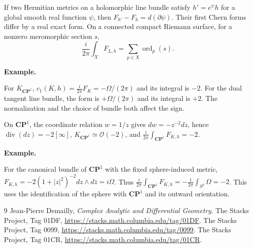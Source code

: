 \documentclass[11pt]{article}
\newcommand{\CP}{\mathbf{CP}}
\newcommand{\exampleheading}{\par\medskip\textbf{Example.}\par\smallskip}
\begin{document}
\begin{tcolorbox}[namedstatement,breakable,title={Metric independence and degree}]
If two Hermitian metrics on a holomorphic line bundle satisfy $h'=e^\psi h$ for a global smooth real function $\psi$, then $F_{h'}-F_h=d(\partial\psi)$. Their first Chern forms differ by a real exact form. On a connected compact Riemann surface, for a nonzero meromorphic section $s$,
\[\frac{i}{2\pi}\int_X F_{L,h}=\sum_{p\in X}\operatorname{ord}_p(s).\]
\exampleheading
For $K_{\CP^1}$, $c_1(K,h)=\frac{i}{2\pi}F_K=-\Omega/(2\pi)$ and its integral is $-2$. For the dual tangent line bundle, the form is $+\Omega/(2\pi)$ and its integral is $+2$. The normalization and the choice of bundle both affect the sign.
\end{tcolorbox}

\begin{tcolorbox}[namedstatement,breakable,title={Canonical bundle of the projective line}]
On $\CP^1$, the coordinate relation $w=1/z$ gives $dw=-z^{-2}dz$, hence $\operatorname{div}(dz)=-2[\infty]$, $K_{\CP^1}\simeq\mathcal O(-2)$, and $\frac{i}{2\pi}\int_{\CP^1}F_{K,h}=-2$.
\exampleheading
For the canonical bundle of $\CP^1$ with the fixed sphere-induced metric, $F_{K,h}=-2(1+|z|^2)^{-2}dz\wedge d\bar z=i\Omega$. Thus $\frac{i}{2\pi}\int_{\CP^1}F_{K,h}=-\frac1{2\pi}\int_{S^2}\Omega=-2$. This uses the identification of the sphere with $\CP^1$ and its outward orientation.
\end{tcolorbox}

\begin{thebibliography}{9}
 Jean-Pierre Demailly, \emph{Complex Analytic and Differential Geometry}.
 The Stacks Project, Tag 01DF, \url{https://stacks.math.columbia.edu/tag/01DF}.
 The Stacks Project, Tag 0099, \url{https://stacks.math.columbia.edu/tag/0099}.
 The Stacks Project, Tag 01CR, \url{https://stacks.math.columbia.edu/tag/01CR}.
\end{thebibliography}
\end{document}
